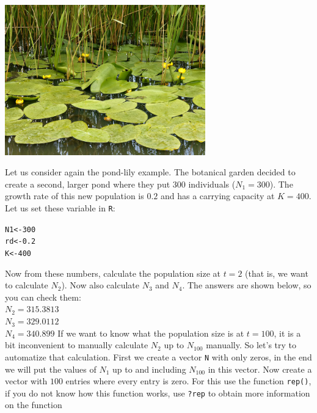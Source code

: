 \documentclass{article}\usepackage[]{graphicx}\usepackage[]{color}
\makeatletter
\newcommand{\hlnum}[1]{\textcolor[rgb]{0.686,0.059,0.569}{#1}}%
\newcommand{\hlstd}[1]{\textcolor[rgb]{0.345,0.345,0.345}{#1}}%
\newcommand{\hlkwb}[1]{\textcolor[rgb]{0.69,0.353,0.396}{#1}}%
\newenvironment{kframe}{%
 \def\at@end@of@kframe{}%
 \ifinner\ifhmode%
  \def\at@end@of@kframe{\end{minipage}}%
  \begin{minipage}{\columnwidth}%
 \fi\fi%
 \def\FrameCommand##1{\hskip\@totalleftmargin \hskip-\fboxsep
 \colorbox{shadecolor}{##1}\hskip-\fboxsep
     \hskip-\linewidth \hskip-\@totalleftmargin \hskip\columnwidth}%
 \MakeFramed {\advance\hsize-\width
   \@totalleftmargin\z@ \linewidth\hsize
   \@setminipage}}%
 {\par\unskip\endMakeFramed%
 \at@end@of@kframe}
\newenvironment{knitrout}{}{} %
\makeatother
\begin{document}
\vspace{1.5ex}

\begin{center}
\includegraphics[width=0.65\textwidth]{Pond_lily.jpg}
\end{center}
\vspace{1.5ex}

Let us consider again the pond-lily example. The botanical garden decided to create a second, larger pond where they put $300$ individuals ($N_1 = 300$). The growth rate of this new population is $0.2$ and has a carrying capacity at $K=400$. Let us set these variable in \texttt{R}:
\begin{knitrout}
\color{fgcolor}\begin{kframe}
\begin{alltt}
\hlstd{N1}\hlkwb{<-}\hlnum{300}
\hlstd{rd}\hlkwb{<-}\hlnum{0.2}
\hlstd{K}\hlkwb{<-}\hlnum{400}
\end{alltt}
\end{kframe}
\end{knitrout}
Now from these numbers, calculate the population size at $t=2$ (that is, we want to calculate $N_2$). Now also calculate $N_3$ and $N_4$. The answers are shown below, so you can check them:\\
$N_2 =  315.3813 $\\$N_3 =  329.0112 $\\$N_4 =  340.899 $
If we want to know what the population size is at $t=100$, it is a bit inconvenient to manually calculate $N_2$ up to $N_{100}$ manually. So let's try to automatize that calculation. First we create a vector \texttt{N} with only zeros, in the end we will put the values of $N_1$ up to and including $N_{100}$ in this vector. Now create a vector with $100$ entries where every entry is zero. For this use the function \texttt{rep()}, if you do not know how this function works, use \texttt{?rep} to obtain more information on the function
\end{document}
